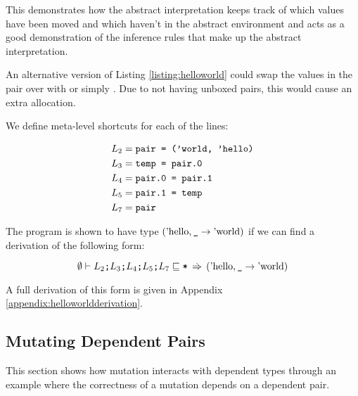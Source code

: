 \documentclass[12pt,twoside]{report}
\begin{document}
This demonstrates how the abstract interpretation keeps track of which values have been moved and which haven't in the abstract environment and acts as a good demonstration of the inference rules that make up the abstract interpretation.

An alternative version of Listing \ref{listing:helloworld} could swap the values in the pair over with  or simply . Due to not having unboxed pairs, this would cause an extra allocation.

We define meta-level shortcuts for each of the lines:

\[\begin{aligned}
L_2 &= \text{\texttt{pair = ('world, 'hello)}} \\
L_3 &= \text{\texttt{temp = pair.0}} \\
L_4 &= \text{\texttt{pair.0 = pair.1}} \\
L_5 &= \text{\texttt{pair.1 = temp}} \\
L_7 &= \text{\texttt{pair}} \\
\end{aligned}\]

The program is shown to have type $(\text{'hello}, \text{\texttt{\_}} \rightarrow \text{'world})$ if we can find a derivation of the following form:

\[
\emptyset \vdash L_2\text{\texttt{;}}L_3\text{\texttt{;}}L_4\text{\texttt{;}}L_5\text{\texttt{;}}L_7 \sqsubseteq \text{\texttt{*}} \,\stackrel{.}{\Rightarrow}\, (\text{'hello}, \text{\texttt{\_}} \rightarrow \text{'world})
\]

A full derivation of this form is given in Appendix  \ref{appendix:helloworldderivation}.

\subsection{Mutating Dependent Pairs}
\label{section:mutatingpairs}
This section shows how mutation interacts with dependent types through an example where the correctness of a mutation depends on a dependent pair.
\end{document}
